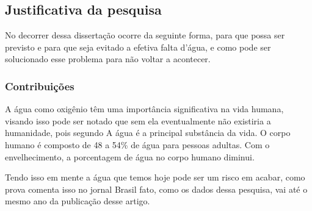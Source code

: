 \subsection{Justificativa da pesquisa} \label{subsec:justif}

No decorrer dessa dissertação ocorre da seguinte forma, para que possa ser previsto e para que seja evitado a efetiva falta d'água, e como pode ser solucionado esse problema para não voltar a acontecer.

\subsubsection{Contribui\c c\~oes} \label{subsubsec:Contribuição}


A água como oxigênio têm uma importância significativa na vida humana, visando isso pode ser notado que sem ela eventualmente não existiria a humanidade, pois segundo  A água é a principal substância da vida. O corpo humano é composto de 48 a 54\% de água para pessoas adultas. Com o envelhecimento, a porcentagem de água no corpo humano diminui.

Tendo isso em mente a água que temos hoje pode ser um risco em acabar, como prova  comenta isso no jornal Brasil fato, como os dados dessa pesquisa, vai até o mesmo ano da publicação desse artigo.

